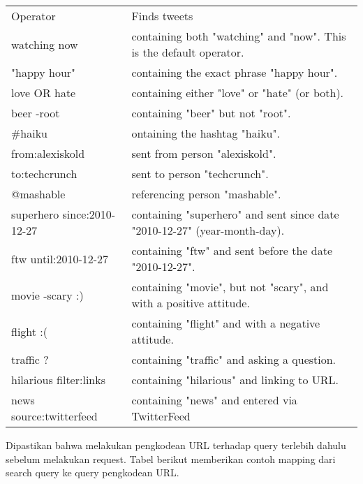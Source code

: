 \begin{table}[h]
\begin{tabular}{ll}
Operator                   & Finds tweets                                                             \\
watching now               & containing both "watching" and "now". This is the default operator.       \\
"happy hour"               & containing the exact phrase "happy hour".                                 \\
love OR hate               & containing either "love" or "hate" (or both).                             \\
beer -root                 & containing "beer" but not "root".                                         \\
\#haiku                    & ontaining the hashtag "haiku".                                            \\
from:alexiskold            & sent from person "alexiskold".                                            \\
to:techcrunch              & sent to person "techcrunch".                                              \\
@mashable                  & referencing person "mashable".                                            \\
superhero since:2010-12-27 & containing "superhero" and sent since date "2010-12-27" (year-month-day). \\
ftw until:2010-12-27       & containing "ftw" and sent before the date "2010-12-27".                   \\
movie -scary :)            & containing "movie", but not "scary", and with a positive attitude.        \\
flight :(                  & containing "flight" and with a negative attitude.                         \\
traffic ?                  & containing "traffic" and asking a question.                               \\
hilarious filter:links     & containing "hilarious" and linking to URL.                                \\
news source:twitterfeed    & containing "news" and entered via TwitterFeed                            
\end{tabular}
\end{table}

Dipastikan bahwa melakukan pengkodean URL terhadap query terlebih dahulu sebelum melakukan request. Tabel berikut memberikan contoh mapping dari search query ke query pengkodean URL.

